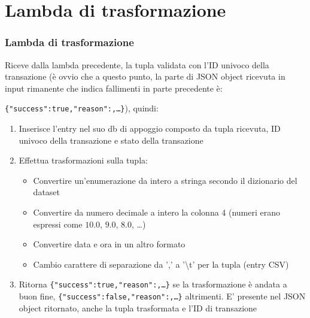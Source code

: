 \documentclass{beamer}
\newcommand{\dflvspace}{\vspace{10pt}}
\begin{document}
\section{Lambda di trasformazione}
\begin{frame}
    \frametitle{Lambda di trasformazione}

    \fontsize{10pt}{10pt}\selectfont

    Riceve dalla lambda precedente, la tupla validata con l'ID univoco della transazione (è ovvio 
    che a questo punto, la parte di JSON object ricevuta in input rimanente che indica fallimenti in parte 
    precedente è:
    
    \texttt{\{\;"success":\;true,\;"reason":,\;\dots\;\}}), quindi:

    \dflvspace

    \begin{enumerate}
        \item Inserisce l'entry nel suo db di appoggio composto da tupla ricevuta, ID univoco della transazione e 
        stato della transazione
        \item Effettua trasformazioni sulla tupla:
        \begin{itemize}
            \item Convertire un'enumerazione da intero a stringa secondo il dizionario del dataset
            \item Convertire da numero decimale a intero la colonna 4 (numeri erano espressi come $10.0$, $9.0$, $8.0$, \dots)
            \item Convertire data e ora in un altro formato
            \item Cambio carattere di separazione da ',' a '\textbackslash t' per la tupla (entry CSV)
        \end{itemize}

        \item Ritorna \texttt{\{\;"success":\;true,\;"reason":,\;\dots\;\}} se la trasformazione è andata
        a buon fine, \texttt{\{\;"success":\;false,\;"reason":,\;\dots\;\}} altrimenti.
        E' presente nel JSON object ritornato, anche la tupla trasformata e l'ID di transazione
    \end{enumerate}
\end{frame}
\end{document}
